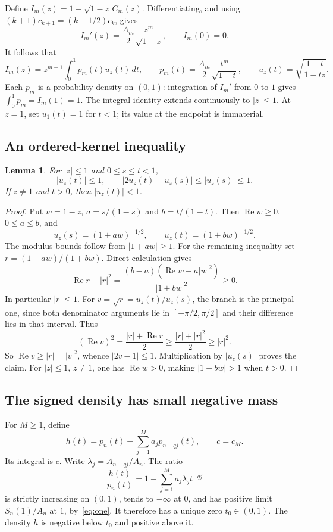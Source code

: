 \documentclass[11pt]{article}
\newtheorem{lemma}{Lemma}
\newcommand{\Rea}{\operatorname{Re}}
\begin{document}
Define $I_m(z)=1-\sqrt{1-z}\,C_m(z)$. Differentiating, and using
$(k+1)c_{k+1}=(k+1/2)c_k$, gives
\[
 I_m'(z)=\frac{A_m}{2}\frac{z^m}{\sqrt{1-z}},\qquad I_m(0)=0.
\]
It follows that
\begin{equation}
 I_m(z)=z^{m+1}\int_0^1 p_m(t)u_z(t)\,dt,\qquad
 p_m(t)=\frac{A_m}{2}\frac{t^m}{\sqrt{1-t}},\qquad
 u_z(t)=\sqrt{\frac{1-t}{1-tz}}.
 \label{eq:beta}
\end{equation}
Each $p_m$ is a probability density on $(0,1)$: integration of
$I_m'$ from $0$ to $1$ gives $\int_0^1p_m=I_m(1)=1$.
The integral identity extends continuously to $|z|\leq1$.
At $z=1$, set $u_1(t)=1$ for $t<1$; its value at the endpoint is immaterial.

\subsection*{An ordered-kernel inequality}

\begin{lemma}\label{lem:kernel}
For $|z|\leq1$ and $0\leq s\leq t<1$,
\[
 |u_z(t)|\leq1,\qquad |2u_z(t)-u_z(s)|\leq |u_z(s)|\leq1.
\]
If $z\ne1$ and $t>0$, then $|u_z(t)|<1$.
\end{lemma}
\begin{proof}
Put $w=1-z$, $a=s/(1-s)$ and $b=t/(1-t)$.
Then $\Rea w\geq0$, $0\leq a\leq b$, and
\[
 u_z(s)=(1+aw)^{-1/2},\qquad
 u_z(t)=(1+bw)^{-1/2}.
\]
The modulus bounds follow from $|1+aw|\geq1$.
For the remaining inequality set $r=(1+aw)/(1+bw)$. Direct calculation gives
\[
 \Rea r-|r|^2
 =\frac{(b-a)(\Rea w+a|w|^2)}{|1+bw|^2}\geq0.
\]
In particular $|r|\leq1$. For $v=\sqrt r=u_z(t)/u_z(s)$, the branch
is the principal one, since both denominator arguments lie in
$[-\pi/2,\pi/2]$ and their difference lies in that interval. Thus
\[
 (\Rea v)^2=\frac{|r|+\Rea r}{2}
       \geq\frac{|r|+|r|^2}{2}\geq |r|^2.
\]
So $\Rea v\geq |r|=|v|^2$, whence $|2v-1|\leq1$.
Multiplication by $|u_z(s)|$ proves the claim.
For $|z|\leq1$, $z\ne1$, one has $\Rea w>0$, making
$|1+bw|>1$ when $t>0$.
\end{proof}

\subsection*{The signed density has small negative mass}

For $M\geq1$, define
\[
 h(t)=p_n(t)-\sum_{j=1}^M a_j p_{n-qj}(t),
 \qquad c=c_M.
\]
Its integral is $c$. Write $\lambda_j=A_{n-qj}/A_n$.
The ratio
\begin{equation}
 \frac{h(t)}{p_n(t)}
     =1-\sum_{j=1}^M a_j\lambda_j t^{-qj}
 \label{eq:cross}
\end{equation}
is strictly increasing on $(0,1)$, tends to $-\infty$ at $0$,
and has positive limit $S_n(1)/A_n$ at $1$, by~\eqref{eq:one}.
It therefore has a unique zero $t_0\in(0,1)$.
The density $h$ is negative below $t_0$ and positive above it.
\end{document}
